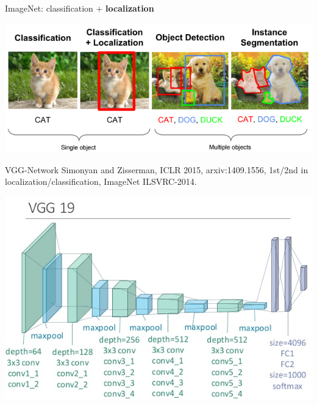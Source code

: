 \documentclass[12pt,t]{beamer}
\begin{document}
\begin{frame}

ImageNet: classification + {\bf localization}

\centerline{
\includegraphics[height=0.5\textheight]{./images/LocalizationDetection.png} 
}

\end{frame}





\begin{frame}{VGG-Network}
Simonyan and Zisserman,  ICLR 2015, arxiv:1409.1556,  1st/2nd in localization/classification, ImageNet ILSVRC-2014.

 \centerline{
\includegraphics[height=0.7\textheight]{./images/vgg19.png} 
}

\end{frame}
\end{document}
